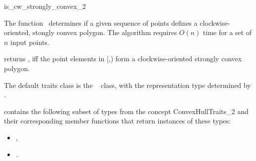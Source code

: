 

\begin{ccRefFunction}{is_cw_strongly_convex_2}  

\ccDefinition
  
The function \ccRefName\ determines if a given sequence of points defines
a clockwise-oriented, stongly convex polygon.  The algorithm requires
$O(n)$ time for a set of $n$ input points.


           {returns , iff the point elements in 
            [,)
            form a clockwise-oriented strongly convex polygon.
           }

The default traits class  is the \cgal\ 
 class,
with the representation type determined by .


 contains the following subset of types from
the concept ConvexHullTraits\_2 and their corresponding member
functions that return instances of these types:
            \begin{itemize}
                \item {}, 
                \item {}.
            \end{itemize}


\ccSeeAlso

 \\

\end{ccRefFunction}


